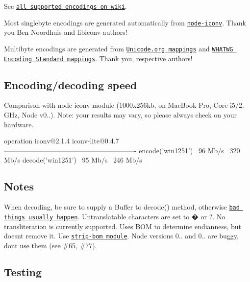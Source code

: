 See \href{https://github.com/ashtuchkin/iconv-lite/wiki/Supported-Encodings}{\tt all supported encodings on wiki}.

Most singlebyte encodings are generated automatically from \href{https://github.com/bnoordhuis/node-iconv}{\tt node-\/iconv}. Thank you Ben Noordhuis and libiconv authors!

Multibyte encodings are generated from \href{http://www.unicode.org/Public/MAPPINGS/}{\tt Unicode.\+org mappings} and \href{http://encoding.spec.whatwg.org/}{\tt W\+H\+A\+T\+W\+G Encoding Standard mappings}. Thank you, respective authors!

\subsection*{Encoding/decoding speed}

Comparison with node-\/iconv module (1000x256kb, on Mac\+Book Pro, Core i5/2. G\+Hz, Node v0..). Note\+: your results may vary, so please always check on your hardware. \begin{DoxyVerb}operation             iconv@2.1.4   iconv-lite@0.4.7
----------------------------------------------------------
encode('win1251')     ~96 Mb/s      ~320 Mb/s
decode('win1251')     ~95 Mb/s      ~246 Mb/s
\end{DoxyVerb}


\subsection*{Notes}

When decoding, be sure to supply a Buffer to decode() method, otherwise \href{https://github.com/ashtuchkin/iconv-lite/wiki/Use-Buffers-when-decoding}{\tt bad things usually happen}. Untranslatable characters are set to � or ?. No transliteration is currently supported. Uses B\+O\+M to determine endianness, but doesn\textquotesingle{}t remove it. Use \href{https://github.com/sindresorhus/strip-bom}{\tt \textquotesingle{}strip-\/bom\textquotesingle{} module}. Node versions 0.. and 0.. are buggy, don\textquotesingle{}t use them (see \#65, \#77).

\subsection*{Testing}




